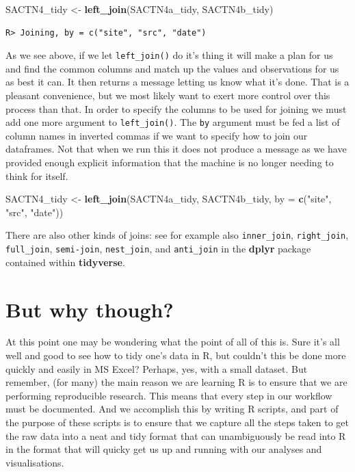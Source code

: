 \documentclass[
]{book}
\newenvironment{Shaded}{\begin{snugshade}}{\end{snugshade}}
\newcommand{\DataTypeTok}[1]{\textcolor[rgb]{0.13,0.29,0.53}{#1}}
\newcommand{\KeywordTok}[1]{\textcolor[rgb]{0.13,0.29,0.53}{\textbf{#1}}}
\newcommand{\NormalTok}[1]{#1}
\newcommand{\StringTok}[1]{\textcolor[rgb]{0.31,0.60,0.02}{#1}}
\begin{document}
\begin{Shaded}
\begin{Highlighting}[]
\NormalTok{SACTN4\_tidy <{-}}\StringTok{ }\KeywordTok{left\_join}\NormalTok{(SACTN4a\_tidy, SACTN4b\_tidy)}
\end{Highlighting}
\end{Shaded}

\begin{verbatim}
R> Joining, by = c("site", "src", "date")
\end{verbatim}

As we see above, if we let \texttt{left\_join()} do it's thing it will make a plan for us and find the common columns and match up the values and observations for us as best it can. It then returns a message letting us know what it's done. That is a pleasant convenience, but we most likely want to exert more control over this process than that. In order to specify the columns to be used for joining we must add one more argument to \texttt{left\_join()}. The \texttt{by} argument must be fed a list of column names in inverted commas if we want to specify how to join our dataframes. Not that when we run this it does not produce a message as we have provided enough explicit information that the machine is no longer needing to think for itself.

\begin{Shaded}
\begin{Highlighting}[]
\NormalTok{SACTN4\_tidy <{-}}\StringTok{ }\KeywordTok{left\_join}\NormalTok{(SACTN4a\_tidy, SACTN4b\_tidy, }\DataTypeTok{by =} \KeywordTok{c}\NormalTok{(}\StringTok{"site"}\NormalTok{, }\StringTok{"src"}\NormalTok{, }\StringTok{"date"}\NormalTok{))}
\end{Highlighting}
\end{Shaded}

There are also other kinds of joins: see for example also \texttt{inner\_join}, \texttt{right\_join}, \texttt{full\_join}, \texttt{semi-join}, \texttt{nest\_join}, and \texttt{anti\_join} in the \textbf{dplyr} package contained within \textbf{tidyverse}.

\hypertarget{but-why-though}{%
\section{But why though?}\label{but-why-though}}

At this point one may be wondering what the point of all of this is. Sure it's all well and good to see how to tidy one's data in R, but couldn't this be done more quickly and easily in MS Excel? Perhaps, yes, with a small dataset. But remember, (for many) the main reason we are learning R is to ensure that we are performing reproducible research. This means that every step in our workflow must be documented. And we accomplish this by writing R scripts, and part of the purpose of these scripts is to ensure that we capture all the steps taken to get the raw data into a neat and tidy format that can unambiguously be read into R in the format that will quicky get us up and running with our analyses and visualisations.
\end{document}
